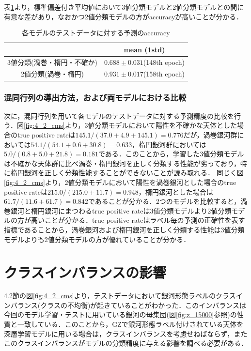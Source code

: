 \documentclass[a4j, 11pt]{jreport}
\begin{document}
表\ref{tb:accs_4.2}より，標準偏差付き平均値において3値分類モデルと2値分類モデルとの間に有意な差があり，なおかつ2値分類モデルの方がaccuracyが高いことが分かる．

\begin{table}[htbp]
  \centering
	\caption{各モデルのテストデータに対する予測のaccuracy}
  \begin{tabular}{|c|c|}
		\hline
    & mean (1std) \\ \hline
    3値分類(渦巻・楕円・不確か) & $0.688 \pm 0.031$(148th epoch) \\ \hline
    2値分類(渦巻・楕円) & $0.931 \pm 0.017$(158th epoch) \\ \hline
  \end{tabular}
  \label{tb:accs_4.2}
\end{table}

\subsubsection{混同行列の導出方法，および両モデルにおける比較}
次に，混同行列を用いて各モデルのテストデータに対する予測精度の比較を行う．図\ref{fig:4_2_cms}より，3値分類モデルにおいて陽性を不確かな天体とした場合のtrue positive rateは$145.1/(37.0+4.9+145.1) = 0.776$だが，渦巻銀河群においては$54.1/(54.1+0.6+30.8) = 0.633$，楕円銀河群においては$5.0/(0.8+5.0+21.8) = 0.181$である．このことから，学習した3値分類モデルは不確かな天体群に比べ渦巻・楕円銀河を正しく分類する性能が劣っており，特に楕円銀河を正しく分類性能することができないことが読み取れる．
同じく図\ref{fig:4_2_cms}より，2値分類モデルにおいて陽性を渦巻銀河とした場合のtrue positive rateは$215.0/(215.0+11.7) = 0.948$，楕円銀河とした場合は$61.7/(11.6+61.7) = 0.842$であることが分かる．2つのモデルを比較すると，渦巻銀河と楕円銀河にまつわるtrue positive rateは3値分類モデルより2値分類モデルの方が高いことが分かる．true positive rateはラベル毎の予測の正確性を表す指標であることから，渦巻銀河および楕円銀河を正しく分類する性能は3値分類モデルよりも2値分類モデルの方が優れていることが分かる．



\newpage
\section{クラスインバランスの影響}
4.2節の図\ref{fig:4_2_cms}より，テストデータにおいて銀河形態ラベルのクラスインバランス(クラスの不均衡)が起きていることがわかった．このインバランスは今回のモデル学習・テストに用いている銀河の母集団(図\ref{fig:z_15000}参照)の性質と一致している．このことから，GZで銀河形態ラベル付けされている天体を深層学習モデルに用いる場合は，クラスインバランスを考慮せねばならず，またこのクラスインバランスがモデルの分類精度に与える影響を調べる必要がある．
\end{document}
